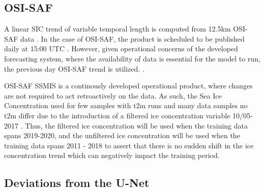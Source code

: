 \subsection{OSI-SAF}
A linear SIC trend of variable temporal length is computed from 12.5km OSI-SAF data . In the case of OSI-SAF, the product is scheduled to be published daily at 15:00 UTC . However, given operational concerns of the developed forecasting system, where the availability of data is essential for the model to run, the previous day OSI-SAF trend is utilized. .

OSI-SAF SSMIS is a continously developed operational product, where changes are not required to act retroactively on the data. As such, the Sea Ice Concentration used for few samples with t2m runs and many data samples no t2m differ due to the introduction of a filtered ice concentration variable 10/05-2017 \cite{Tonboe2017}. Thus, the filtered ice concentration will be used when the training data spans 2019-2020, and the unfiltered ice concentration will be used when the training data spans 2011 - 2018 to assert that there is no sudden shift in the ice concentration trend which can negatively impact the training period.


\subsection{Deviations from the U-Net}




